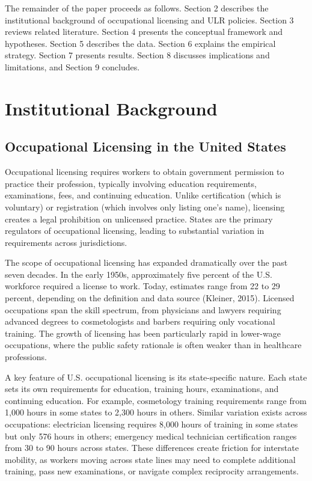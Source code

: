 \documentclass[12pt]{article}
\begin{document}
The remainder of the paper proceeds as follows. Section 2 describes the institutional background of occupational licensing and ULR policies. Section 3 reviews related literature. Section 4 presents the conceptual framework and hypotheses. Section 5 describes the data. Section 6 explains the empirical strategy. Section 7 presents results. Section 8 discusses implications and limitations, and Section 9 concludes.

\section{Institutional Background}

\subsection{Occupational Licensing in the United States}

Occupational licensing requires workers to obtain government permission to practice their profession, typically involving education requirements, examinations, fees, and continuing education. Unlike certification (which is voluntary) or registration (which involves only listing one's name), licensing creates a legal prohibition on unlicensed practice. States are the primary regulators of occupational licensing, leading to substantial variation in requirements across jurisdictions.

The scope of occupational licensing has expanded dramatically over the past seven decades. In the early 1950s, approximately five percent of the U.S. workforce required a license to work. Today, estimates range from 22 to 29 percent, depending on the definition and data source (Kleiner, 2015). Licensed occupations span the skill spectrum, from physicians and lawyers requiring advanced degrees to cosmetologists and barbers requiring only vocational training. The growth of licensing has been particularly rapid in lower-wage occupations, where the public safety rationale is often weaker than in healthcare professions.

A key feature of U.S. occupational licensing is its state-specific nature. Each state sets its own requirements for education, training hours, examinations, and continuing education. For example, cosmetology training requirements range from 1,000 hours in some states to 2,300 hours in others. Similar variation exists across occupations: electrician licensing requires 8,000 hours of training in some states but only 576 hours in others; emergency medical technician certification ranges from 30 to 90 hours across states. These differences create friction for interstate mobility, as workers moving across state lines may need to complete additional training, pass new examinations, or navigate complex reciprocity arrangements.
\end{document}
